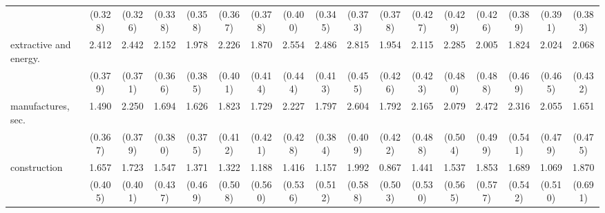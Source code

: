 {\begin{tabular}{l*{16}{c}}
                    &     (0.328)         &     (0.326)         &     (0.338)         &     (0.358)         &     (0.367)         &     (0.378)         &     (0.400)         &     (0.345)         &     (0.373)         &     (0.378)         &     (0.427)         &     (0.429)         &     (0.426)         &     (0.389)         &     (0.391)         &     (0.383)         \\
[1em]
extractive and energy.&       2.412\sym{***}&       2.442\sym{***}&       2.152\sym{***}&       1.978\sym{***}&       2.226\sym{***}&       1.870\sym{***}&       2.554\sym{***}&       2.486\sym{***}&       2.815\sym{***}&       1.954\sym{***}&       2.115\sym{***}&       2.285\sym{***}&       2.005\sym{***}&       1.824\sym{***}&       2.024\sym{***}&       2.068\sym{***}\\
                    &     (0.379)         &     (0.371)         &     (0.366)         &     (0.385)         &     (0.401)         &     (0.414)         &     (0.444)         &     (0.413)         &     (0.455)         &     (0.426)         &     (0.423)         &     (0.480)         &     (0.488)         &     (0.469)         &     (0.465)         &     (0.432)         \\
[1em]
manufactures, sec.  &       1.490\sym{***}&       2.250\sym{***}&       1.694\sym{***}&       1.626\sym{***}&       1.823\sym{***}&       1.729\sym{***}&       2.227\sym{***}&       1.797\sym{***}&       2.604\sym{***}&       1.792\sym{***}&       2.165\sym{***}&       2.079\sym{***}&       2.472\sym{***}&       2.316\sym{***}&       2.055\sym{***}&       1.651\sym{***}\\
                    &     (0.367)         &     (0.379)         &     (0.380)         &     (0.375)         &     (0.412)         &     (0.421)         &     (0.428)         &     (0.384)         &     (0.409)         &     (0.422)         &     (0.488)         &     (0.504)         &     (0.499)         &     (0.541)         &     (0.479)         &     (0.475)         \\
[1em]
construction        &       1.657\sym{***}&       1.723\sym{***}&       1.547\sym{***}&       1.371\sym{**} &       1.322\sym{**} &       1.188\sym{*}  &       1.416\sym{**} &       1.157\sym{*}  &       1.992\sym{***}&       0.867         &       1.441\sym{**} &       1.537\sym{**} &       1.853\sym{**} &       1.689\sym{**} &       1.069\sym{*}  &       1.870\sym{**} \\
                    &     (0.405)         &     (0.401)         &     (0.437)         &     (0.469)         &     (0.508)         &     (0.560)         &     (0.536)         &     (0.512)         &     (0.588)         &     (0.503)         &     (0.530)         &     (0.565)         &     (0.577)         &     (0.542)         &     (0.510)         &     (0.691)         \\

\end{tabular}}
